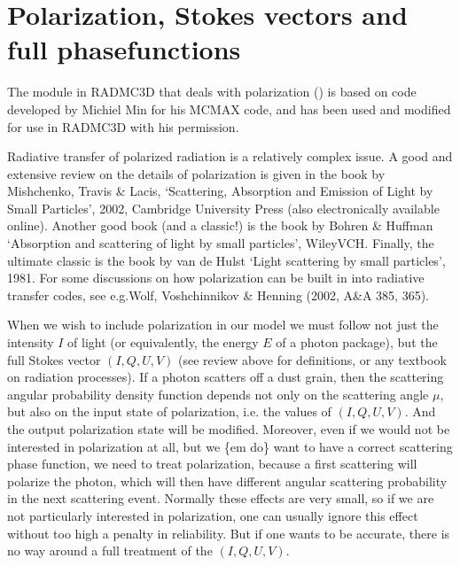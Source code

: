 \documentclass[letterpaper,10pt,english]{sphinxmanual}
\begin{document}
\section{Polarization, Stokes vectors and full phase\sphinxhyphen{}functions}
\label{\detokenize{dustradtrans:polarization-stokes-vectors-and-full-phase-functions}}\label{\detokenize{dustradtrans:sec-polarized-scattering}}
The module in RADMC\sphinxhyphen{}3D that deals with polarization
() is based on code developed by Michiel Min for his
MCMAX code, and has been used and modified for use in RADMC\sphinxhyphen{}3D with his
permission.

Radiative transfer of polarized radiation is a relatively complex issue. A good
and extensive review on the details of polarization is given in the book by
Mishchenko, Travis \& Lacis, ‘Scattering, Absorption and Emission of Light by
Small Particles’, 2002, Cambridge University Press (also electronically
available on\sphinxhyphen{}line). Another good book (and a classic!)  is the book by Bohren \&
Huffman ‘Absorption and scattering of light by small particles’,
Wiley\sphinxhyphen{}VCH. Finally, the ultimate classic is the book by van de Hulst ‘Light
scattering by small particles’, 1981. For some discussions on how polarization
can be built in into radiative transfer codes, see e.g.Wolf, Voshchinnikov \&
Henning (2002, A\&A 385, 365).

When we wish to include polarization in our model we must follow not just the
intensity \(I\) of light (or equivalently, the energy \(E\) of a photon
package), but the full Stokes vector \((I,Q,U,V)\) (see review above for
definitions, or any textbook on radiation processes). If a photon scatters off a
dust grain, then the scattering angular probability density function depends not
only on the scattering angle \(\mu\), but also on the input state of
polarization, i.e. the values of \((I,Q,U,V)\). And the output polarization
state will be modified. Moreover, even if we would not be interested in
polarization at all, but we \{em do\} want to have a correct scattering phase
function, we need to treat polarization, because a first scattering will
polarize the photon, which will then have different angular scattering
probability in the next scattering event. Normally these effects are very small,
so if we are not particularly interested in polarization, one can usually ignore
this effect without too high a penalty in reliability. But if one wants to be
accurate, there is no way around a full treatment of the \((I,Q,U,V)\).
\end{document}
